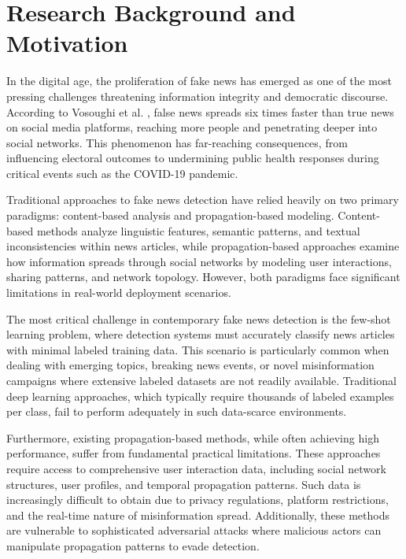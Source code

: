 
\section{Research Background and Motivation}

In the digital age, the proliferation of fake news has emerged as one of the most pressing challenges threatening information integrity and democratic discourse. According to Vosoughi et al. \cite{vosoughi2018spread}, false news spreads six times faster than true news on social media platforms, reaching more people and penetrating deeper into social networks. This phenomenon has far-reaching consequences, from influencing electoral outcomes to undermining public health responses during critical events such as the COVID-19 pandemic.

Traditional approaches to fake news detection have relied heavily on two primary paradigms: content-based analysis and propagation-based modeling. Content-based methods analyze linguistic features, semantic patterns, and textual inconsistencies within news articles, while propagation-based approaches examine how information spreads through social networks by modeling user interactions, sharing patterns, and network topology. However, both paradigms face significant limitations in real-world deployment scenarios.

The most critical challenge in contemporary fake news detection is the few-shot learning problem, where detection systems must accurately classify news articles with minimal labeled training data. This scenario is particularly common when dealing with emerging topics, breaking news events, or novel misinformation campaigns where extensive labeled datasets are not readily available. Traditional deep learning approaches, which typically require thousands of labeled examples per class, fail to perform adequately in such data-scarce environments.

Furthermore, existing propagation-based methods, while often achieving high performance, suffer from fundamental practical limitations. These approaches require access to comprehensive user interaction data, including social network structures, user profiles, and temporal propagation patterns. Such data is increasingly difficult to obtain due to privacy regulations, platform restrictions, and the real-time nature of misinformation spread. Additionally, these methods are vulnerable to sophisticated adversarial attacks where malicious actors can manipulate propagation patterns to evade detection.

